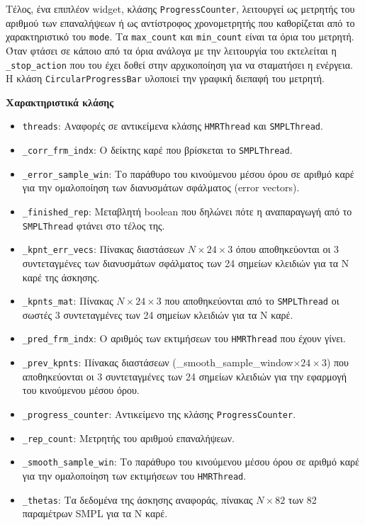 Τέλος, ένα επιπλέον widget, κλάσης \texttt{ProgressCounter}, λειτουργεί ως μετρητής του αριθμού των επαναλήψεων ή ως αντίστροφος χρονομετρητής που καθορίζεται από το χαρακτηριστικό του \texttt{mode}. Τα \texttt{max\_count} και \texttt{min\_count} είναι τα όρια του μετρητή. Όταν φτάσει σε κάποιο από τα όρια ανάλογα με την λειτουργία του εκτελείται η \texttt{\_stop\_action} που του έχει δοθεί στην αρχικοποίηση για να σταματήσει η ενέργεια. Η κλάση \texttt{CircularProgressBar} υλοποιεί την γραφική διεπαφή του μετρητή. 


\noindent\textbf{Χαρακτηριστικά κλάσης}
\begin{itemize}
	\item \texttt{threads}: Αναφορές σε αντικείμενα κλάσης \texttt{HMRThread} και \texttt{SMPLThread}.
	\item \texttt{\_corr\_frm\_indx}: Ο δείκτης καρέ που βρίσκεται το \texttt{SMPLThread}.
	\item \texttt{\_error\_sample\_win}: Το παράθυρο του κινούμενου μέσου όρου σε αριθμό καρέ για την ομαλοποίηση των διανυσμάτων σφάλματος (error vectors).
	\item \texttt{\_finished\_rep}: Μεταβλητή boolean που δηλώνει πότε η αναπαραγωγή από το \texttt{SMPLThread} φτάνει στο τέλος της.
	\item \texttt{\_kpnt\_err\_vecs}: Πίνακας διαστάσεων $N \times 24 \times 3$ όπου αποθηκεύονται οι 3 συντεταγμένες των διανυσμάτων σφάλματος των 24 σημείων κλειδιών για τα N καρέ της άσκησης.
	\item \texttt{\_kpnts\_mat}: Πίνακας $Ν \times 24 \times 3$ που αποθηκεύονται από το \texttt{SMPLThread} οι σωστές 3 συντεταγμένες των 24 σημείων κλειδιών για τα Ν καρέ.
	\item \texttt{\_pred\_frm\_indx}: Ο αριθμός των εκτιμήσεων του \texttt{HMRThread} που έχουν γίνει.
	\item \texttt{\_prev\_kpnts}: Πίνακας διαστάσεων (\_smooth\_sample\_window$\times 24 \times 3$) που αποθηκεύονται οι 3 συντεταγμένες των 24 σημείων κλειδιών για την εφαρμογή του κινούμενου μέσου όρου.
	\item \texttt{\_progress\_counter}: Αντικείμενο της κλάσης \texttt{ProgressCounter}.
	\item \texttt{\_rep\_count}: Μετρητής του αριθμού επαναλήψεων.
	\item \texttt{\_smooth\_sample\_win}: Το παράθυρο του κινούμενου μέσου όρου σε αριθμό καρέ για την ομαλοποίηση των εκτιμήσεων του \texttt{HMRThread}.
	\item \texttt{\_thetas}: Τα δεδομένα της άσκησης αναφοράς, πίνακας $Ν \times 82$ των 82 παραμέτρων SMPL για τα Ν καρέ.
\end{itemize}

